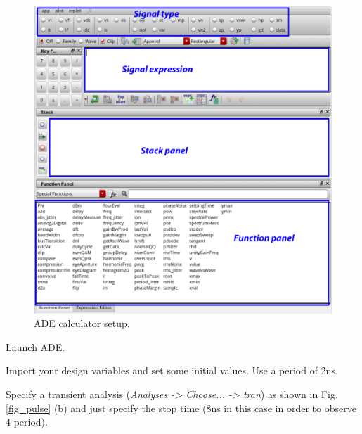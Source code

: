 \begin{enumerate}
	\parbox[t]{\dimexpr\textwidth-\leftmargin}{%
		\begin{figure}
			\vspace{-0mm}
			\centering
			\vspace{-\baselineskip}
			\includegraphics[scale=0.32]{figures/lab1_schematic_sim/calculator_tuto}
			\caption{ADE calculator setup.}
			\label{calculator}
		\end{figure}
		\item Launch ADE.
		\item Import your design variables and set some initial values. Use a period of 2ns.
		\item Specify a transient analysis (\textit{Analyses -> Choose... -> tran}) as shown in Fig. \ref{fig_pulse} (b) and just specify the stop time (8ns in this case in order to observe 4 period). 
		
}
\end{enumerate}
